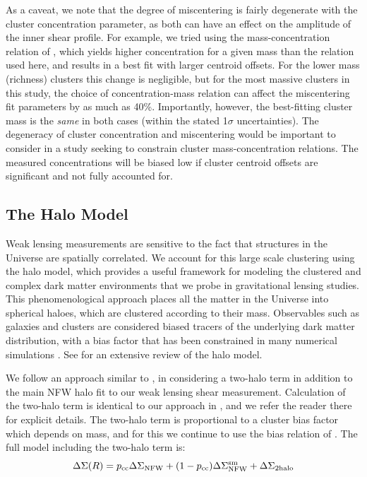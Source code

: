 As a caveat, we note that the degree of miscentering is fairly degenerate with the cluster concentration parameter, as both can have an effect on the amplitude of the inner shear profile. For example, we tried using the mass-concentration relation of \citet{Prada12}, which yields higher concentration for a given mass than the \citet{Dutton14} relation used here, and results in a best fit with larger centroid offsets. For the lower mass (richness) clusters this change is negligible, but for the most massive clusters in this study, the choice of concentration-mass relation can affect the miscentering fit parameters by as much as 40\%. Importantly, however, the best-fitting cluster mass is the {\it same} in both cases (within the stated 1$\sigma$ uncertainties). The degeneracy of cluster concentration and miscentering would be important to consider in a study seeking to constrain cluster mass-concentration relations. The measured concentrations will be biased low if cluster centroid offsets are significant and not fully accounted for.



\subsection{The Halo Model}
\label{sec:halomodel}
Weak lensing measurements are sensitive to the fact that structures in the Universe are spatially correlated. We account for this large scale clustering using the halo model, which provides a useful framework for modeling the clustered and complex dark matter environments that we probe in gravitational lensing studies. This phenomenological approach places all the matter in the Universe into spherical haloes, which are clustered according to their mass. Observables such as galaxies and clusters are considered biased tracers of the underlying dark matter distribution, with a bias factor that has been constrained in many numerical simulations \citep[e.g.][]{Mo96,Sheth99,Tinker10}. See \citet{Cooray02} for an extensive review of the halo model.

We follow an approach similar to \citet{Johnston07}, in considering a two-halo term in addition to the main \ac{NFW} halo fit to our weak lensing shear measurement. Calculation of the two-halo term is identical to our approach in \citet{Ford14}, and we refer the reader there for explicit details. The two-halo term is proportional to a cluster bias factor which depends on mass, and for this we continue to use the bias relation of \citet{Seljak04}. The full model including the two-halo term is:
\begin{equation}
\Delta\Sigma(R) = p_{\mathrm{cc}}\Delta\Sigma_{\mathrm{NFW}} +(1-p_{\mathrm{cc}})\Delta\Sigma_{\mathrm{NFW}}^{\rm sm} + \Delta\Sigma_{\mathrm{2halo}}
\label{modelEQ}
\end{equation}


